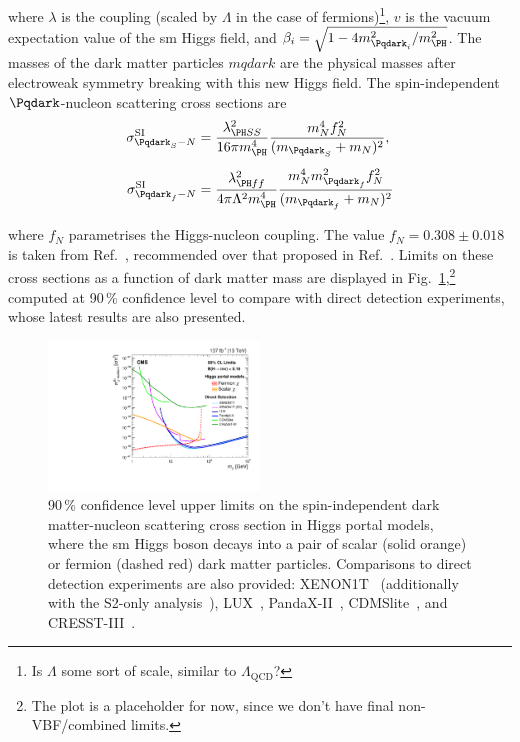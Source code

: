 where $\lambda$ is the coupling (scaled by $\Lambda$ in the case of fermions)\footnote{Is $\Lambda$ some sort of scale, similar to $\Lambda_{\mathrm{QCD}}$?}, $v$ is the vacuum expectation value of the \acrshort{sm} Higgs field, and $\beta_i = \sqrt{1 - 4m_{\Pqdark_i}^2/m_{\PH}^2}$. The masses of the dark matter particles $mqdark$ are the physical masses after electroweak symmetry breaking with this new Higgs field. The spin-independent $\Pqdark$-nucleon scattering cross sections are
\begin{equation}
    \begin{aligned}
\sigma^{\mathrm{SI}}_{\Pqdark_{S}-N} &= \frac{\lambda^2_{\PH SS} }{ 16 \pi m_{\PH}^4} \frac{ m_N^4 f_N^2 }{ (m_{\Pqdark_{S}} + m_N)^2 },\\[0.5em]
\sigma^{\mathrm{SI}}_{\Pqdark_{f}-N} &= \frac{\lambda^2_{\PH ff} }{ 4 \pi \Lambda^2 m_{\PH}^4} \frac{ m_N^4 m_{\Pqdark_{f}}^2 f_N^2 }{ (m_{\Pqdark_{f}} + m_N)^2 }
    \end{aligned}
\end{equation}

where $f_N$ parametrises the Higgs-nucleon coupling. The value $f_N = \text{0.308} \pm \text{0.018}$ is taken from Ref.~, recommended over that proposed in Ref.~. Limits on these cross sections as a function of dark matter mass are displayed in Fig.~\ref{fig:higgs_portal_dm_limits},\footnote{The plot is a placeholder for now, since we don't have final non-VBF/combined limits.} computed at 90\,\% confidence level to compare with direct detection experiments, whose latest results are also presented.

\begin{figure}
    \centering
    \includegraphics[width=0.5\textwidth]{figures/dark_matter_limit/higgsPortalDM.pdf}
    \caption[90\,\% confidence level upper limits on the spin-independent dark matter-nucleon scattering cross section in Higgs portal models, where the standard model Higgs boson decays into a pair of scalar (solid orange) or fermion (dashed red) dark matter particles]{90\,\% confidence level upper limits on the spin-independent dark matter-nucleon scattering cross section in Higgs portal models, where the \acrlong{sm} Higgs boson decays into a pair of scalar (solid orange) or fermion (dashed red) dark matter particles. Comparisons to direct detection experiments are also provided: XENON1T~\cite{Aprile:2018dbl} (additionally with the S2-only analysis~\cite{Aprile:2019xxb}), LUX~\cite{Akerib:2016vxi}, PandaX-II~\cite{Cui:2017nnn}, CDMSlite~\cite{Agnese:2018gze}, and CRESST-III~\cite{Abdelhameed:2019hmk}.}
    \label{fig:higgs_portal_dm_limits}
\end{figure}

